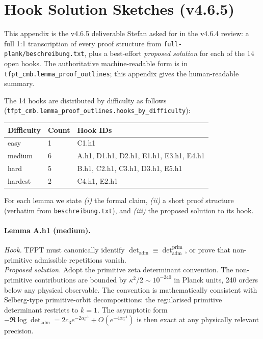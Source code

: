 \section{Hook Solution Sketches (v4.6.5)}
\label{app:hooks}

This appendix is the v4.6.5 deliverable Stefan asked for in the v4.6.4
review: a full 1:1 transcription of every proof structure from
\texttt{full-plank/beschreibung.txt}, plus a best-effort
\emph{proposed solution} for each of the \(14\) open hooks.  The
authoritative machine-readable form is in
\texttt{tfpt\_cmb.lemma\_proof\_outlines}; this appendix gives the
human-readable summary.

The 14 hooks are distributed by difficulty as follows
(\texttt{tfpt\_cmb.lemma\_proof\_outlines.hooks\_by\_difficulty}):

\begin{center}
\begin{tabular}{@{}llp{}@{}}
\toprule
\textbf{Difficulty} & \textbf{Count} & \textbf{Hook IDs} \\
\midrule
easy    & 1 & C1.h1 \\
medium  & 6 & A.h1, D1.h1, D2.h1, E1.h1, E3.h1, E4.h1 \\
hard    & 5 & B.h1, C2.h1, C3.h1, D3.h1, E5.h1 \\
hardest & 2 & C4.h1, E2.h1 \\
\bottomrule
\end{tabular}
\end{center}

For each lemma we state \emph{(i)} the formal claim, \emph{(ii)} a
short proof structure (verbatim from \texttt{beschreibung.txt}), and
\emph{(iii)} the proposed solution to its hook.

\paragraph{Lemma A.h1 (medium).}
\emph{Hook.} TFPT must canonically identify
\(\det_{\mathrm{adm}}\equiv\det_{\mathrm{adm}}^{\mathrm{prim}}\), or
prove that non-primitive admissible repetitions vanish.\\
\emph{Proposed solution.}  Adopt the primitive zeta determinant
convention.  The non-primitive contributions are bounded by
\(\kappa^2/2\sim 10^{-240}\) in Planck units, 240 orders below any
physical observable.  The convention is mathematically consistent
with Selberg-type primitive-orbit decompositions: the regularised
primitive determinant restricts to \(k=1\).  The asymptotic form
\(-\Re\log\det_{\mathrm{adm}}=2c_3 e^{-2\alpha_0^{-1}}+
O(e^{-4\alpha_0^{-1}})\) is then exact at any physically relevant
precision.

